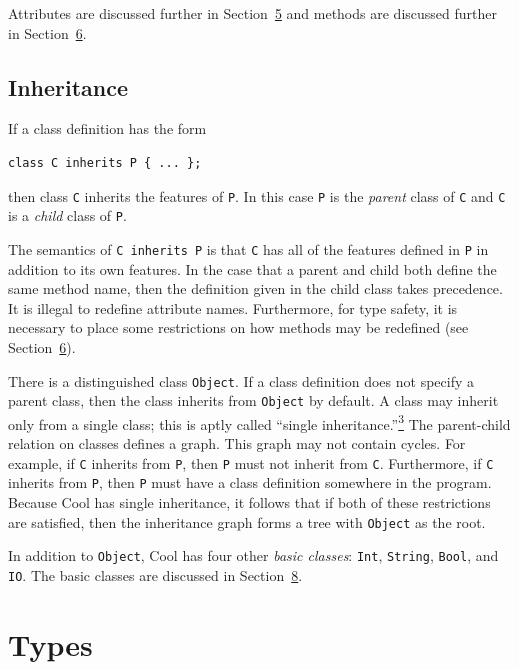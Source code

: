 \documentclass[]{article}
\begin{document}
Attributes are discussed further in
Section~\href{node10.html\#sec-attr}{5} and methods are discussed
further in Section~\href{node12.html\#sec-method}{6}.

\subsection{Inheritance}

If a class definition has the form

\begin{verbatim}
class C inherits P { ... };
\end{verbatim}

then class \texttt{C} inherits the features of \texttt{P}. In this case
\texttt{P} is the \emph{parent} class of \texttt{C} and \texttt{C} is a
\emph{child} class of \texttt{P}.

The semantics of \texttt{C inherits P} is that \texttt{C} has all of the
features defined in \texttt{P} in addition to its own features. In the
case that a parent and child both define the same method name, then the
definition given in the child class takes precedence. It is illegal to
redefine attribute names. Furthermore, for type safety, it is necessary
to place some restrictions on how methods may be redefined (see
Section~\href{node12.html\#sec-method}{6}).

There is a distinguished class \texttt{Object}. If a class definition
does not specify a parent class, then the class inherits from
\texttt{Object} by default. A class may inherit only from a single
class; this is aptly called ``single
inheritance.''\href{footnode.html\#foot386}{\textsuperscript{3}} The
parent-child relation on classes defines a graph. This graph may not
contain cycles. For example, if \texttt{C} inherits from \texttt{P},
then \texttt{P} must not inherit from \texttt{C}. Furthermore, if
\texttt{C} inherits from \texttt{P}, then \texttt{P} must have a class
definition somewhere in the program. Because Cool has single
inheritance, it follows that if both of these restrictions are
satisfied, then the inheritance graph forms a tree with \texttt{Object}
as the root.

In addition to \texttt{Object}, Cool has four other \emph{basic
classes}: \texttt{Int}, \texttt{String}, \texttt{Bool}, and \texttt{IO}.
The basic classes are discussed in
Section~\href{node26.html\#sec-basic}{8}.

\section{Types}
\end{document}
